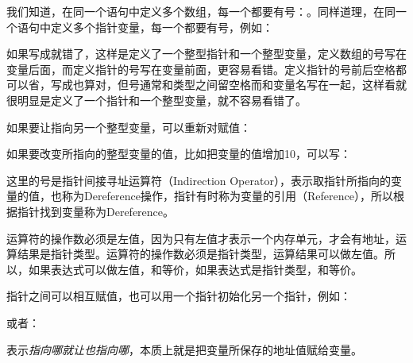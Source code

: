 我们知道，在同一个语句中定义多个数组，每一个都要有\BookCode{[\BookSplit{}]\BookSplit{}}号：。同样道理，在同一个语句中定义多个指针变量，每一个都要有\BookCode{*}号，例如：




如果写成就错了，这样是定义了一个整型指针和一个整型变量，定义数组的\BookCode{[\BookSplit{}]\BookSplit{}}号写在变量后面，而定义指针的\BookCode{*}号写在变量前面，更容易看错。定义指针的\BookCode{*}号前后空格都可以省，写成也算对，但\BookCode{*}号通常和类型之间留空格而和变量名写在一起，这样看就很明显是定义了一个指针和一个整型变量，就不容易看错了。



如果要让指向另一个整型变量，可以重新对赋值：




如果要改变所指向的整型变量的值，比如把变量的值增加10，可以写：




这里的\BookCode{*}号是指针间接寻址运算符（Indirection Operator），表示取指针所指向的变量的值，也称为Dereference操作，指针有时称为变量的引用（Reference），所以根据指针找到变量称为Dereference。



\BookCode{\&}运算符的操作数必须是左值，因为只有左值才表示一个内存单元，才会有地址，运算结果是指针类型。\BookCode{*}运算符的操作数必须是指针类型，运算结果可以做左值。所以，如果表达式可以做左值，和等价，如果表达式是指针类型，和等价。



指针之间可以相互赋值，也可以用一个指针初始化另一个指针，例如：




或者：




表示\emph{指向哪就让也指向哪}，本质上就是把变量所保存的地址值赋给变量。



